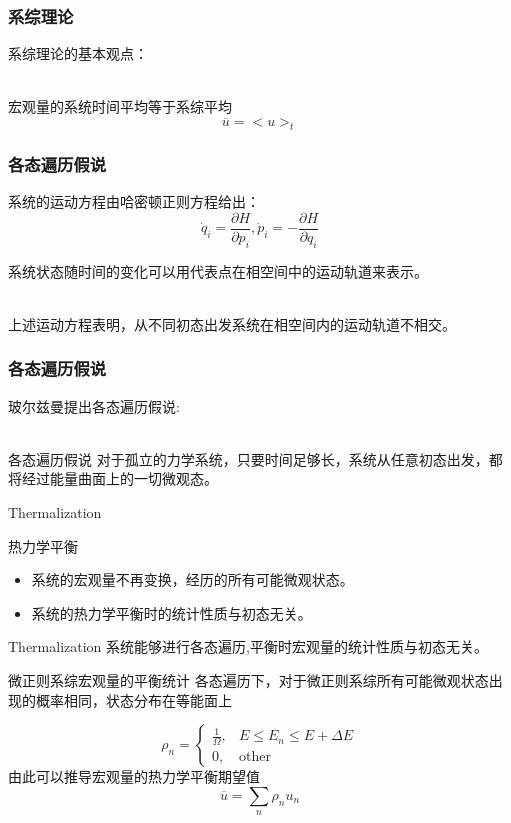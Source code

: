 \documentclass{beamer}
\begin{document}
\begin{frame}
\frametitle{系综理论}
\noindent
系综理论的基本观点：\\~\\
\begin{block}{宏观量的系统时间平均等于系综平均}
$$\overline{u} = <u>_t$$
\end{block}
\end{frame}
\begin{frame}
\frametitle{各态遍历假说}
系统的运动方程由哈密顿正则方程给出：
$$\dot{q}_i=\frac{\partial H}{\partial p_i},\dot{p}_i=-\frac{\partial H}{\partial q_i}$$

系统状态随时间的变化可以用代表点在相空间中的运动轨道来表示。\\~

\pause 上述运动方程表明，从不同初态出发系统在相空间内的运动轨道不相交。

\end{frame}

\begin{frame}
\frametitle{各态遍历假说}
\noindent
玻尔兹曼提出各态遍历假说:\\~

\begin{block}{各态遍历假说}
对于孤立的力学系统，只要时间足够长，系统从任意初态出发，都将经过能量曲面上的一切微观态。
\end{block}
\end{frame}

\begin{frame}{Thermalization}
\noindent

\begin{block}{热力学平衡}
\begin{itemize}
\item 系统的宏观量不再变换，经历的所有可能微观状态。
\item 系统的热力学平衡时的统计性质与初态无关。
\end{itemize}
\end{block}
\noindent
\begin{block}{Thermalization}
系统能够进行各态遍历,平衡时宏观量的统计性质与初态无关。
\end{block}
\end{frame}

\begin{frame}{微正则系综宏观量的平衡统计}
\noindent
各态遍历下，对于微正则系综所有可能微观状态出现的概率相同，状态分布在等能面上

$$
{\rho}_n=
\begin{cases}
\frac{1}{\Omega},&E\le E_n \le E+\Delta E\\ 
0, &\text{other}
\end{cases}
$$
由此可以推导宏观量的热力学平衡期望值
$$\overline{u}=\sum_{n}{\rho_n u_n}$$

\end{frame}
\end{document}
